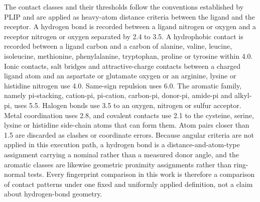 The contact classes and their thresholds follow the conventions established by PLIP \cite{ref054} and are applied as heavy-atom distance criteria between the ligand and the receptor. A hydrogen bond is recorded between a ligand nitrogen or oxygen and a receptor nitrogen or oxygen separated by 2.4 to 3.5\angstrom{}. A hydrophobic contact is recorded between a ligand carbon and a carbon of alanine, valine, leucine, isoleucine, methionine, phenylalanine, tryptophan, proline or tyrosine within 4.0\angstrom{}. Ionic contacts, salt bridges and attractive-charge contacts between a charged ligand atom and an aspartate or glutamate oxygen or an arginine, lysine or histidine nitrogen use 4.0\angstrom{}. Same-sign repulsion uses 6.0\angstrom{}. The aromatic family, namely pi-stacking, cation-pi, pi-cation, carbon-pi, donor-pi, amide-pi and alkyl-pi, uses 5.5\angstrom{}. Halogen bonds use 3.5\angstrom{} to an oxygen, nitrogen or sulfur acceptor. Metal coordination uses 2.8\angstrom{}, and covalent contacts use 2.1\angstrom{} to the cysteine, serine, lysine or histidine side-chain atoms that can form them. Atom pairs closer than 1.5\angstrom{} are discarded as clashes or coordinate errors. Because angular criteria are not applied in this execution path, a hydrogen bond is a distance-and-atom-type assignment carrying a nominal rather than a measured donor angle, and the aromatic classes are likewise geometric proximity assignments rather than ring-normal tests. Every fingerprint comparison in this work is therefore a comparison of contact patterns under one fixed and uniformly applied definition, not a claim about hydrogen-bond geometry.

